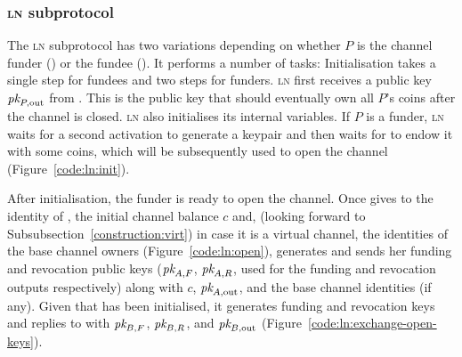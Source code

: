   \subsubsection{\textsc{ln} subprotocol}
  \label{construction:ln}
  The \textsc{ln} subprotocol has two variations depending on whether $P$ is the
  channel funder (\alice) or the fundee (\bob). It performs a number of tasks:
  Initialisation takes a single step for fundees and two steps for funders.
  \textsc{ln} first receives a public key $\textit{pk}_{P, \mathrm{out}}$ from
  \environment. This is the public key that should eventually own all $P$'s
  coins after the channel is closed. \textsc{ln} also initialises its internal
  variables. If $P$ is a funder, \textsc{ln} waits for a second activation to
  generate a keypair and then waits for \environment to endow it with some
  coins, which will be subsequently used to open the channel
  (Figure~\ref{code:ln:init}).

  After initialisation, the funder \alice is ready to open the channel. Once
  \environment gives to \alice the identity of \bob, the initial channel balance
  $c$ and, (looking forward to Subsubsection~\ref{construction:virt})
  in case it is a virtual channel, the identities of the base channel owners
  (Figure~\ref{code:ln:open}), \alice generates and sends \bob her funding and
  revocation public keys ($\textit{pk}_{A, F}$, $\textit{pk}_{A, R}$, used for the funding and
  revocation outputs respectively) along with $c$, $\textit{pk}_{A,
  \mathrm{out}}$, and the base channel identities (if any). Given that \bob has
  been initialised, it generates funding and revocation keys and replies to
  \alice with $\textit{pk}_{B, F}$, $\textit{pk}_{B, R}$, and $\textit{pk}_{B, \mathrm{out}}$
  (Figure~\ref{code:ln:exchange-open-keys}).

